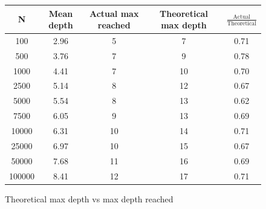 \documentclass[a4paper,11pt]{article}
\begin{document}
    \begin{figure}[H]
        \centering
        \begin{tabular}{c|c|c|c|c}
            N & Mean depth & Actual max reached & Theoretical max depth & $\frac{\text{Actual}}{\text{Theoretical}}$ \\
            \hline
            \hline
            100 & 2.96 & 5 & 7 & 0.71 \\
            500 & 3.76 & 7 & 9 & 0.78 \\
            1000 & 4.41 & 7 & 10 & 0.70 \\
            2500 & 5.14 & 8 & 12 & 0.67 \\
            5000 & 5.54 & 8 & 13 & 0.62 \\
            7500 & 6.05 & 9 & 13 & 0.69 \\
            10000 & 6.31 & 10 & 14 & 0.71 \\
            25000 & 6.97 & 10 & 15 & 0.67 \\
            50000 & 7.68 & 11 & 16 & 0.69 \\
            100000 & 8.41 & 12 & 17 & 0.71 \\
        \end{tabular}
        \caption{Theoretical max depth vs max depth reached}
        \label{fig:depth-table}
    \end{figure}
\end{document}
